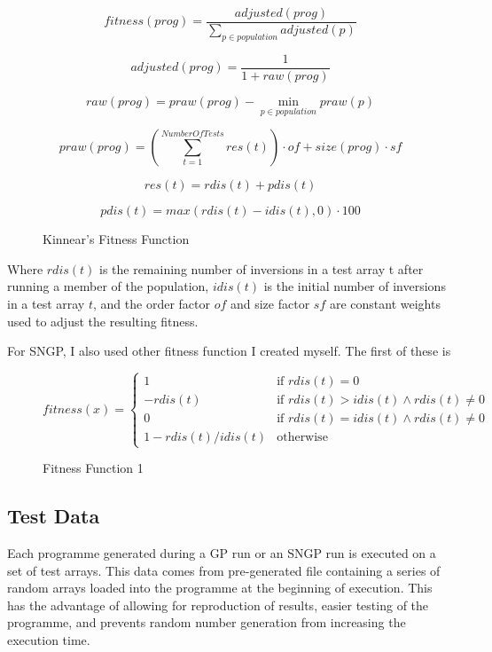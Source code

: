\documentclass{article}
\begin{document}
        \begin{figure}[H]
            $$fitness(prog) = \frac{adjusted(prog)}{\sum_{p\in population}^{}adjusted(p)}$$
            
            $$adjusted(prog) = \frac{1}{1 + raw(prog)}$$
            
            $$raw(prog) = praw(prog) - \min_{p\in population} praw(p)$$
            
            $$praw(prog) = \left(\sum_{t = 1}^{Number Of Tests}res(t)\right) \cdot of + size(prog) \cdot sf$$
            
            $$res(t) = rdis(t) + pdis(t)$$
            
            $$pdis(t) = max(rdis(t) - idis(t), 0) \cdot 100$$
            
            \caption{Kinnear's Fitness Function}
            
            \label{kinnear_fitness}		
        
        \end{figure}
        Where $rdis(t)$ is the remaining number of inversions in a test array t after running a member of the population, $idis(t)$ is the initial number of inversions in a test array $t$, and the order factor $of$ and size factor $sf$ are constant weights used to adjust the resulting fitness.
        
        For SNGP, I also used other fitness function I created myself. The first of these is
        
        \begin{figure}[H]
        	$   fitness(x) =
        	\begin{cases} 
	        	1 & \mbox{if } rdis(t) = 0 \\
	        	-rdis(t) & \mbox{if } rdis(t) > idis(t) \land rdis(t) \neq 0 \\
	        	0 & \mbox{if }  rdis(t) = idis(t) \land rdis(t) \neq 0 \\
	        	1 - rdis(t)/idis(t) & \mbox{otherwise }
        	\end{cases}
        	$
        	
        	\caption{Fitness Function 1}
        	\label{ftns_func1}
        \end{figure}

    \subsection{Test Data}
        
        Each programme generated during a GP run or an SNGP run is executed on a set of test arrays. This data comes from pre-generated file containing a series of random arrays loaded into the programme at the beginning of execution. This has the advantage of allowing for reproduction of results, easier testing of the programme, and prevents random number generation from increasing the execution time.
        
\end{document}
